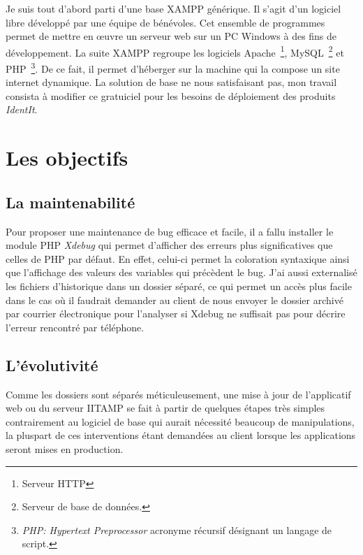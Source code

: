 Je suis tout d'abord parti d'une base XAMPP générique. Il s'agit d'un
logiciel libre développé par une équipe de bénévoles. Cet ensemble de
programmes permet de mettre en \oe{}uvre un serveur web sur un PC
Windows à des fins de développement. La suite XAMPP regroupe les
logiciels Apache\, \footnote{Serveur HTTP}, MySQL\, \footnote{Serveur de
base de données.} et PHP\, \footnote{\emph{PHP: Hypertext Preprocessor}
acronyme récursif désignant un langage de script.}. De ce fait, il
permet d'héberger sur la machine qui la compose un site internet
dynamique. La solution de base ne nous satisfaisant pas, mon travail
consista à modifier ce gratuiciel pour les besoins de déploiement des
produits \emph{IdentIt}.

\section{Les objectifs} %
\label{sec:Les objectifs}

\subsection{La maintenabilité} %
\label{sub:La maintenabilité}

Pour proposer une maintenance de bug efficace et facile, il a fallu
installer le module PHP \emph{Xdebug} qui permet d'afficher des erreurs
plus significatives que celles de PHP par défaut. En effet, celui-ci
permet la coloration syntaxique ainsi que l'affichage des valeurs des
variables qui précèdent le bug. J'ai aussi externalisé les fichiers
d'historique dans un dossier séparé, ce qui permet un accès plus facile
dans le cas où il faudrait demander au client de nous envoyer le dossier
archivé par courrier électronique pour l'analyser si Xdebug ne suffisait
pas pour décrire l'erreur rencontré par téléphone.

\subsection{L'évolutivité} %
\label{sub:L'évolutivité}

Comme les dossiers sont séparés méticuleusement, une mise à jour de
l'applicatif web ou du serveur IITAMP se fait à partir de quelques
étapes très simples contrairement au logiciel de base qui aurait
nécessité beaucoup de manipulations, la pluspart de ces interventions
étant demandées au client lorsque les applications seront mises en
production.

